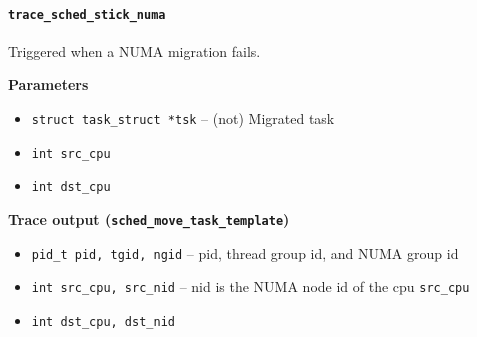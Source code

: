\paragraph{\texttt{trace\_sched\_stick\_numa}}
Triggered when a NUMA migration fails. 

\textbf{Parameters}
\begin{itemize}
    \item \verb|struct task_struct *tsk| -- (not) Migrated task
    \item \verb|int src_cpu|
    \item \verb|int dst_cpu|
\end{itemize}

\textbf{Trace output (\texttt{sched\_move\_task\_template})}
\begin{itemize}
    \item \verb|pid_t pid, tgid, ngid| -- pid, thread group id, and NUMA group id
    \item \verb|int src_cpu, src_nid| -- nid is the NUMA node id of the cpu \verb|src_cpu|
    \item \verb|int dst_cpu, dst_nid|
\end{itemize}


